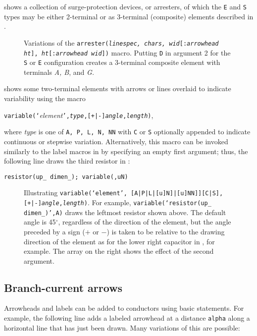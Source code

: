  shows a collection of surge-protection devices, or arresters,
of which the {\tt E} and {\tt S} types may be either 2-terminal or as
3-terminal (composite) elements described in .
\begin{figure}[ht]
   
   \caption{Variations of the {\tt arrester({\sl linespec, chars,}
     {\sl wid}[{\tt :}{\sl arrowhead ht}],
     {\sl ht}[{\tt :}{\sl arrowhead wid}])}
     macro. Putting {\tt D} in argument 2 for the {\tt S} or {\tt E}
     configuration creates a 3-terminal composite element
     with terminals {\sl A, B}, and {\sl G.}}
   \label{Arresters}
   \end{figure}

 shows some two-terminal elements with
arrows or lines overlaid to indicate variability using the macro
\par
{\tt variable(`}{\sl element}{\tt',{\sl type},[+|-]{\sl angle},{\sl length})},

\noindent
where {\sl type} is one of {\tt A, P, L, N, NN} with {\tt C} or {\tt S}
optionally appended to indicate continuous or stepwise variation.
Alternatively, this macro
can be invoked similarly to the label macros in
 by specifying an empty first argument;
thus, the following line draws the third resistor in :
\par
   {\tt resistor(up\_ dimen\_); variable(,uN)}

\begin{figure}[ht]
\vspace*{-\baselineskip}
   
   \caption{Illustrating
{\tt variable(`{\sl element}',%
[A|P|L|[u]N]|[u]NN]][C|S],[+|-]{\sl angle},{\sl length})}.
   For example, {\tt variable(`resistor(up\_ dimen\_)',A)} draws
   the leftmost resistor shown above.
   The default angle is 45${}^{\circ}$, regardless of the direction of
   the element, but the angle preceded by a sign ($+$ or $-$) is taken
   to be relative to the drawing direction of the element as for the
   lower right capacitor in , for example.  The array on
   the right shows the effect of the second argument.}
   \label{Variable}
   \end{figure}

\subsection{Branch-current arrows\label{Branchcurrent:}}
Arrowheads and labels can be added to conductors using basic
\pic statements.  For example, the following line adds a labeled
arrowhead at a distance {\tt alpha} along a horizontal line that has
just been drawn.  Many variations of this are possible:

